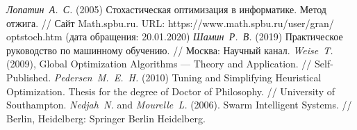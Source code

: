 \clearpage                                  %




\begin{thebibliography}{7}
	 \textit{Лопатин\ А.\ С.} (2005) Стохастическая оптимизация
в информатике. Метод отжига. // Сайт Math.spbu.ru. URL: https://www.math.spbu.ru/user/gran/\\optstoch.htm (дата обращения: 20.01.2020)
	 \textit{Шамин\ Р.\ В.} (2019) Практическое руководство по машинному обучению. // Москва: Научный канал.
	 \textit{Weise\ T.} (2009), Global Optimization Algorithms --- Theory and
Application. // Self-Published.
	 \textit{Pedersen\ M.\ E.\ H.} (2010) Tuning and Simplifying Heuristical Optimization. Thesis for the degree of Doctor of Philosophy. // University of Southampton.
	 \textit{Nedjah\ N.} and \textit{Mourelle\ L.} (2006). Swarm Intelligent Systems. // Berlin, Heidelberg: Springer Berlin Heidelberg.
\end{thebibliography}
